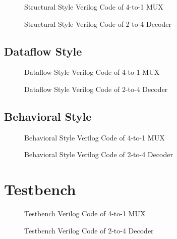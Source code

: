 \documentclass{report}
\begin{document}
            \begin{figure}[ht]
                \centering
                
                \caption{Structural Style Verilog Code of 4-to-1 MUX}
            \end{figure}

            \begin{figure}[ht]
                \centering
                
                \caption{Structural Style Verilog Code of 2-to-4 Decoder}
            \end{figure}
            
            \subsection{Dataflow Style}

            \begin{figure}[ht]
                \centering
                
                \caption{Dataflow Style Verilog Code of 4-to-1 MUX}
            \end{figure}

            \begin{figure}[ht]
                \centering
                
                \caption{Dataflow Style Verilog Code of 2-to-4 Decoder}
            \end{figure}

            \newpage
            \subsection{Behavioral Style}

            \begin{figure}[ht]
                \centering
                
                \caption{Behavioral Style Verilog Code of 4-to-1 MUX}
            \end{figure}

            \begin{figure}[ht]
                \centering
                
                \caption{Behavioral Style Verilog Code of 2-to-4 Decoder}
            \end{figure}

        \section{Testbench} 
            \begin{figure}[ht]
                \centering
                
                \caption{Testbench Verilog Code of 4-to-1 MUX}
            \end{figure}
            \begin{figure}[ht]
                \centering
                
                \caption{Testbench Verilog Code of 2-to-4 Decoder}
            \end{figure} 
\end{document}
